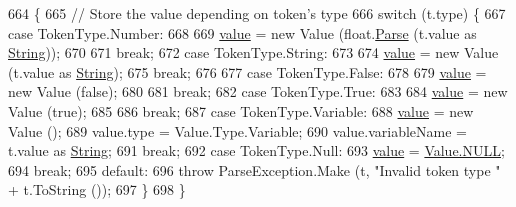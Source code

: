 \begin{DoxyCode}
664                                            \{
665                 \textcolor{comment}{// Store the value depending on token's type}
666                 \textcolor{keywordflow}{switch} (t.type) \{
667                 \textcolor{keywordflow}{case} TokenType.Number:
668 
669                     \hyperlink{a00087_a51ab5939344f9bfa21181c02cf0e341d}{value} = \textcolor{keyword}{new} Value (\textcolor{keywordtype}{float}.\hyperlink{a00064_a811cc7226f4f4a2f3440cdb67ad14468}{Parse} (t.value as \hyperlink{a00026_a301aa7c866593a5b625a8fc158bbeacea27118326006d3829667a400ad23d5d98}{String}));
670 
671                     \textcolor{keywordflow}{break};
672                 \textcolor{keywordflow}{case} TokenType.String:
673 
674                     \hyperlink{a00087_a51ab5939344f9bfa21181c02cf0e341d}{value} = \textcolor{keyword}{new} Value (t.value as \hyperlink{a00026_a301aa7c866593a5b625a8fc158bbeacea27118326006d3829667a400ad23d5d98}{String});
675                     \textcolor{keywordflow}{break};
676 
677                 \textcolor{keywordflow}{case} TokenType.False:
678 
679                     \hyperlink{a00087_a51ab5939344f9bfa21181c02cf0e341d}{value} = \textcolor{keyword}{new} Value (\textcolor{keyword}{false});
680 
681                     \textcolor{keywordflow}{break};
682                 \textcolor{keywordflow}{case} TokenType.True:
683 
684                     \hyperlink{a00087_a51ab5939344f9bfa21181c02cf0e341d}{value} = \textcolor{keyword}{new} Value (\textcolor{keyword}{true});
685 
686                     \textcolor{keywordflow}{break};
687                 \textcolor{keywordflow}{case} TokenType.Variable:
688                     \hyperlink{a00087_a51ab5939344f9bfa21181c02cf0e341d}{value} = \textcolor{keyword}{new} Value ();
689                     value.type = Value.Type.Variable;
690                     value.variableName = t.value as \hyperlink{a00026_a301aa7c866593a5b625a8fc158bbeacea27118326006d3829667a400ad23d5d98}{String};
691                     \textcolor{keywordflow}{break};
692                 \textcolor{keywordflow}{case} TokenType.Null:
693                     \hyperlink{a00087_a51ab5939344f9bfa21181c02cf0e341d}{value} = \hyperlink{a00086_a1ed2964965baca8621c45efa23f37660}{Value.NULL};
694                     \textcolor{keywordflow}{break};
695                 \textcolor{keywordflow}{default}:
696                     \textcolor{keywordflow}{throw} ParseException.Make (t, \textcolor{stringliteral}{"Invalid token type "} + t.ToString ());
697                 \}
698             \}
\end{DoxyCode}


